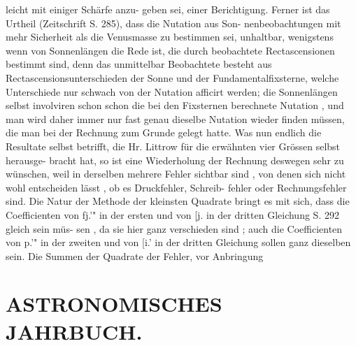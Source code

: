\documentclass[12pt,a4paper]{article}
\begin{document}
{{{{{{{{leicht  mit  einiger  Schärfe  anzu- geben sei,  einer  Berichtigung.  Ferner  ist  das  Urtheil  (Zeitschrift  S.  285),  dass  die  Nutation  aus  Son- nenbeobachtungen mit  mehr  Sicherheit  als  die  Venusmasse  zu  bestimmen  sei,  unhaltbar,  wenigstens wenn  von  Sonnenlängen  die  Rede  ist,  die  durch  beobachtete  Rectascensionen  bestimmt  sind,  denn  das unmittelbar  Beobachtete  besteht  aus  Rectascensionsunterschieden  der  Sonne  und  der  Fundamentalfixsterne, welche  Unterschiede  nur  schwach  von  der  Nutation  afficirt  werden;  die  Sonnenlängen  selbst  involviren schon  schon  die  bei  den  Fixsternen  berechnete  Nutation ,  und  man  wird  daher  immer  nur  fast  genau dieselbe  Nutation  wieder  finden  müssen,  die  man  bei  der  Rechnung  zum  Grunde  gelegt  hatte.  Was  nun endlich  die  Resultate  selbst  betrifft,  die  Hr.  Littrow  für  die  erwähnten  vier  Grössen  selbst  herausge- bracht hat,  so  ist  eine  Wiederholung  der  Rechnung  deswegen  sehr  zu  wünschen,  weil  in  derselben mehrere  Fehler  sichtbar  sind ,  von  denen  sich  nicht  wohl  entscheiden  lässt ,  ob  es  Druckfehler,  Schreib- fehler oder  Rechnungsfehler  sind.  Die  Natur  der  Methode  der  kleinsten  Quadrate  bringt  es  mit  sich, dass  die  Coefficienten  von  fj.'"  in  der  ersten  und  von  [j.  in  der  dritten  Gleichung  S.  292  gleich  sein  müs- sen ,  da  sie  hier  ganz  verschieden  sind ;  auch  die  Coefficienten  von  p.'"  in  der  zweiten  und  von  [i.'  in  der dritten  Gleichung  sollen  ganz  dieselben  sein.     Die  Summen   der  Quadrate   der  Fehler,   vor  Anbringung


\section*{ASTRONOMISCHES  JAHRBUCH.}

}}}}}}}}
\end{document}
